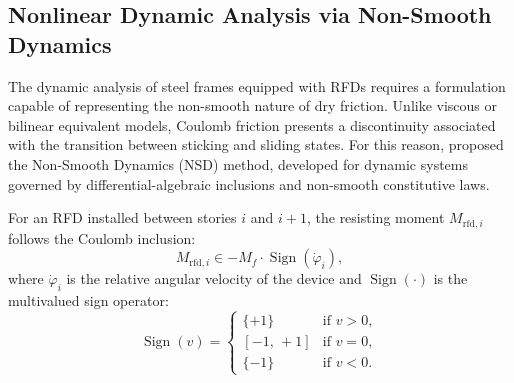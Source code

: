 \documentclass[preprint,12pt,authoryear]{elsarticle}
\newcommand{\Mf}{M_{\!f}}                      %
\begin{document}
\subsection{Nonlinear Dynamic Analysis via Non-Smooth Dynamics}
\label{sec:theory:nsd}

The dynamic analysis of steel frames equipped with RFDs requires a formulation
capable of representing the non-smooth nature of dry friction. Unlike viscous or
bilinear equivalent models, Coulomb friction presents a discontinuity associated
with the transition between sticking and sliding states. For this reason,
\citet{Namorado2024} proposed the Non-Smooth Dynamics (NSD) method, developed
for dynamic systems governed by differential-algebraic inclusions and non-smooth
constitutive laws.

For an RFD installed between stories $i$ and $i+1$, the resisting moment
$M_{\mathrm{rfd},i}$ follows the Coulomb inclusion:
\begin{equation}
    M_{\mathrm{rfd},i} \in -\Mf \cdot \operatorname{Sign}\!\left(\dot{\varphi}_i\right),
    \label{eq:coulomb}
\end{equation}
where $\dot{\varphi}_i$ is the relative angular velocity of the device and
$\operatorname{Sign}(\cdot)$ is the multivalued sign operator:
\begin{equation}
    \operatorname{Sign}(v) =
    \begin{cases}
        \{+1\}        & \text{if } v > 0, \\
        [-1,\,+1]     & \text{if } v = 0, \\
        \{-1\}        & \text{if } v < 0.
    \end{cases}
    \label{eq:sign}
\end{equation}
\end{document}
